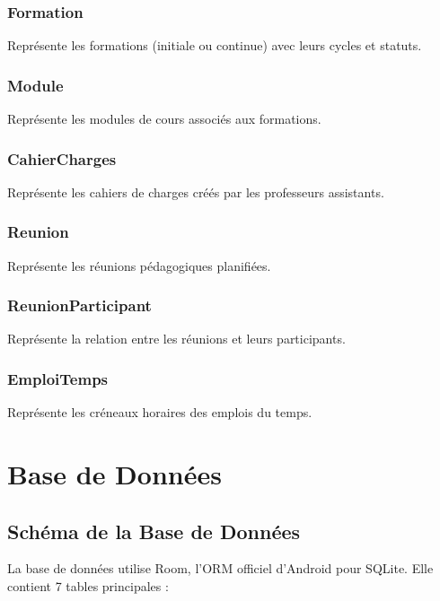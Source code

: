 \documentclass[12pt,a4paper]{report}
\begin{document}
\subsubsection{Formation}
Représente les formations (initiale ou continue) avec leurs cycles et statuts.

\subsubsection{Module}
Représente les modules de cours associés aux formations.

\subsubsection{CahierCharges}
Représente les cahiers de charges créés par les professeurs assistants.

\subsubsection{Reunion}
Représente les réunions pédagogiques planifiées.

\subsubsection{ReunionParticipant}
Représente la relation entre les réunions et leurs participants.

\subsubsection{EmploiTemps}
Représente les créneaux horaires des emplois du temps.

\section{Base de Données}

\subsection{Schéma de la Base de Données}

La base de données utilise Room, l'ORM officiel d'Android pour SQLite. Elle contient 7 tables principales :
\end{document}
